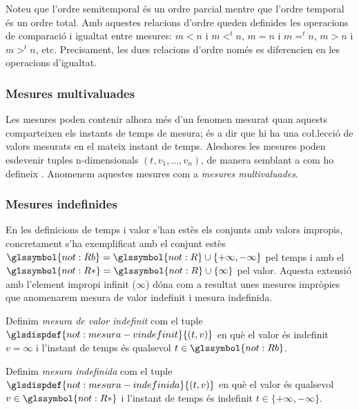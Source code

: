 Noteu que l'ordre semitemporal és un ordre parcial mentre que l'ordre
temporal és un ordre total.  Amb aquestes relacions d'ordre queden
definides les operacions de comparació i igualtat entre mesures: $m <
n$ i $m<^t n$, $m=n$ i $m=^t n$, $m > n$ i $m>^t n$, etc.
Precisament, les dues relacions d'ordre només es diferencien en
les operacions d'igualtat.




\subsubsection{Mesures multivaluades}

Les mesures poden contenir alhora més d'un fenomen mesurat quan
aquests comparteixen els instants de temps de mesura; és a dir que hi
ha una co\l.lecció de valors mesurats en el mateix instant de temps.
Aleshores les mesures poden esdevenir tuples n-dimensionals
$(t,v_1,\dotsc,v_n)$, de manera semblant a com ho defineix
\textcite{assfalg08:thesis}.  Anomenem aquestes mesures com a \emph{mesures
multivaluades}.



\subsubsection{Mesures indefinides}



En les definicions de temps i valor s'han estès els conjunts amb
valors impropis, concretament s'ha exemplificat amb el conjunt estès
$\glssymbol{not:Rb} = \glssymbol{not:R} \cup \{+\infty,-\infty\}$ pel
temps i amb el $\glssymbol{not:R*}=\glssymbol{not:R} \cup\{\infty\}$
pel valor. Aquesta extensió amb l'element impropi infinit ($\infty$)
dóna com a resultat unes mesures impròpies que anomenarem mesura de
valor indefinit i mesura indefinida.

\begin{definition}
  \label{def:model:mesura_valor_indefinit}
  Definim \emph{mesura de valor indefinit} com el tuple
  $\glsdispdef{not:mesura-vindefinit}{(t,v)}$ en què el valor és
  indefinit $v=\infty$ i l'instant de temps és qualsevol
  $t\in\glssymbol{not:Rb}$.
\end{definition}

\begin{definition}
  \label{def:model:mesura_indefinida}
  Definim \emph{mesura indefinida} com el tuple
  $\glsdispdef{not:mesura-indefinida}{(t,v)}$ en què el valor és
  qualsevol $v\in\glssymbol{not:R*}$ i l'instant de temps és indefinit
  $t\in\{+\infty,-\infty\}$.
\end{definition}

